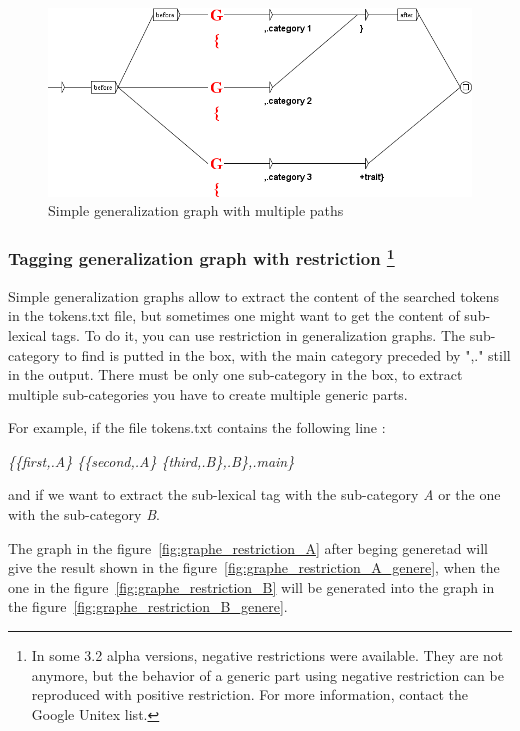 \begin{figure}[!htb]
  \centering
  \includegraphics[width=14cm]{resources/img/graphe_generique_plusieurs_chemins.png}
  \caption{Simple generalization graph with multiple paths}
  \label{fig:graphe_generique_plusieurs_chemins}
\end{figure}

\subsubsection{Tagging generalization graph with restriction \protect\footnote{In some 3.2 alpha versions, negative restrictions were available. They are not anymore, but the behavior of a generic part using negative restriction can be reproduced with positive restriction. For more information, contact the Google Unitex list.}}

Simple generalization graphs allow to extract the content of the searched tokens in the tokens.txt file, but sometimes one might want to get the content of sub-lexical tags. To do it, you can use restriction in generalization graphs. The sub-category to find is putted in the box, with the main category preceded by ",." still in the output. There must be only one sub-category in the box, to extract multiple sub-categories you have to create multiple generic parts.


\bigskip
For example, if the file tokens.txt contains the following line :


\emph{\{\{first,.A\} \{\{second,.A\} \{third,.B\},.B\},.main\}}

and if we want to extract the sub-lexical tag with the sub-category \textit{A} or the one with the sub-category \textit{B}.

\bigskip
The graph in the figure~\ref{fig:graphe_restriction_A} after beging generetad will give the result shown in the figure~\ref{fig:graphe_restriction_A_genere}, when the one in the figure~\ref{fig:graphe_restriction_B} will be generated into the graph in the figure~\ref{fig:graphe_restriction_B_genere}.


